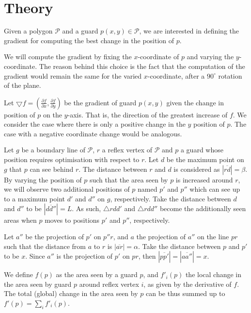 \section{Theory}

Given a polygon $\mathcal P$ and a guard $p(x, y) \in \mathcal P$, we are interested in defining the gradient for computing the best change in the position of $p$.

We will compute the gradient by fixing the $x$-coordinate of $p$ and varying the $y$-coordinate. The reason behind this choice is the fact that the computation of the gradient would remain the same for the varied $x$-coordinate, after a $90^\circ$ rotation of the plane.

Let $\bigtriangledown f = (\frac{\partial f}{\partial x}, \frac{\partial f}{\partial y})$ be the gradient of guard $p(x, y)$ given the change in position of $p$ on the $y$-axis. That is, the direction of the greatest increase of $f$. We consider the case where there is only a positive change in the $y$ position of $p$. The case with a negative coordinate change would be analogous.

Let $g$ be a boundary line of $\mathcal P$, $r$ a reflex vertex of $\mathcal P$ and $p$ a guard whose position requires optimisation with respect to $r$. Let $d$ be the maximum point on $g$ that $p$ can see behind $r$. The distance between $r$ and $d$ is considered as $|\overline{rd}| = \beta$. By varying the position of $p$ such that the area seen by $p$ is increased around $r$, we will observe two additional positions of $p$ named $p'$ and $p''$ which can see up to a maximum point $d'$ and $d''$ on $g$, respectively. Take the distance between $d$ and $d''$ to be $|\overline{dd''}| = L$. As such, $\triangle rdd'$ and $\triangle rdd''$ become the additionally seen areas when $p$ moves to positions $p'$ and $p''$, respectively. 

Let $a''$ be the projection of $p'$ on $p''r$, and $a$ the projection of $a''$ on the line $pr$ such that the distance from $a$ to $r$ is $|\overline{ar}| = \alpha$. Take the distance between $p$ and $p'$ to be $x$. Since $a''$ is the projection of $p'$ on $pr$, then $|\overline{pp'}| = |\overline{aa''}| = x$.

We define $f(p)$ as the area seen by a guard $p$, and $f'_i(p)$ the local change in the area seen by guard $p$ around reflex vertex $i$, as given by the derivative of $f$. The total (global) change in the area seen by $p$ can be thus summed up to $f'(p) = \sum_i f'_i(p)$.



